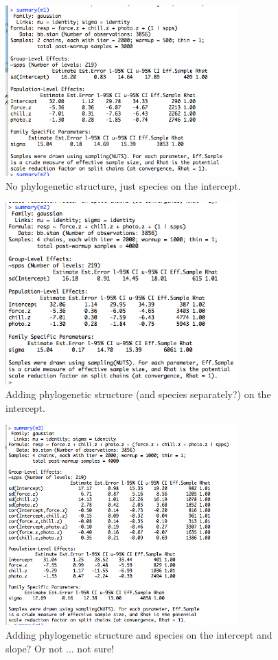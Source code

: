 \documentclass[11pt,letter]{article}
\begin{document}
\begin{figure}[h!]
\centering
\noindent \includegraphics[width=0.8\textwidth]{figures/brms_m1.png} 
\caption{No phylogenetic structure, just species on the intercept.}
\end{figure}


\begin{figure}[h!]
\centering
\noindent \includegraphics[width=0.8\textwidth]{figures/brms_m2.png} 
\caption{Adding phylogenetic structure (and species separately?) on the intercept.}
\end{figure}

\begin{figure}[h!]
\centering
\noindent \includegraphics[width=0.8\textwidth]{figures/brms_m3.png} 
\caption{Adding phylogenetic structure and species on the intercept and slope? Or not ... not sure!}
\end{figure}
\end{document}
